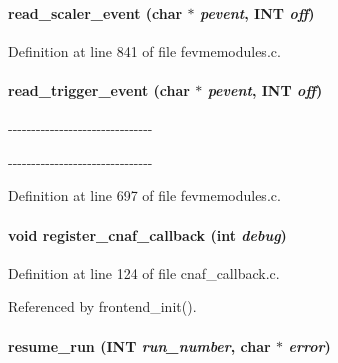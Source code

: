 \paragraph[{read\_\-scaler\_\-event}]{ read\_\-scaler\_\-event (char $\ast$ {\em pevent}, \/  {\bf INT} {\em off})}\hfill\label{fevmemodules_8c_af3ad062393c1437922bae26841d8927c}


Definition at line 841 of file fevmemodules.c.
\paragraph[{read\_\-trigger\_\-event}]{ read\_\-trigger\_\-event (char $\ast$ {\em pevent}, \/  {\bf INT} {\em off})}\hfill\label{fevmemodules_8c_a9c54bafa1af403e5e4737f9d8d5aba07}


-\/-\/-\/-\/-\/-\/-\/-\/-\/-\/-\/-\/-\/-\/-\/-\/-\/-\/-\/-\/-\/-\/-\/-\/-\/-\/-\/-\/-\/-\/-\/

-\/-\/-\/-\/-\/-\/-\/-\/-\/-\/-\/-\/-\/-\/-\/-\/-\/-\/-\/-\/-\/-\/-\/-\/-\/-\/-\/-\/-\/-\/-\/ 

Definition at line 697 of file fevmemodules.c.
\paragraph[{register\_\-cnaf\_\-callback}]{\setlength{\rightskip}{0pt plus 5cm}void register\_\-cnaf\_\-callback (int {\em debug})}\hfill\label{fevmemodules_8c_a4c2c646c3b139346601893d06cf6df9d}


Definition at line 124 of file cnaf\_\-callback.c.

Referenced by frontend\_\-init().
\paragraph[{resume\_\-run}]{ resume\_\-run ({\bf INT} {\em run\_\-number}, \/  char $\ast$ {\em error})}\hfill\label{fevmemodules_8c_a6cada7e3f07b9fc2b9886263223661d4}



